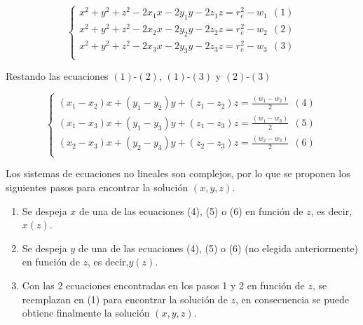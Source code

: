         \begin{equation*}
            \left\{ \begin{array}{c}
            	x^{2}+y^{2} +z^{2}-2x_{1}x-2y_{1}y-2z_{1}z = r_{e}^{2}- w_{1}~~  \left( 1 \right) \\
            	x^{2}+y^{2} +z^{2}-2x_{2}x-2y_{2}y-2z_{2}z = r_{e}^{2}- w_{2}~~  \left( 2 \right) \\
            	x^{2}+y^{2} +z^{2}-2x_{3}x-2y_{3}y-2z_{3}z = r_{e}^{2}- w_{3}~~  \left( 3 \right) \\
                \end{array} \right.   
        \end{equation*}
        
        Restando las ecuaciones $(1)$-$(2)$, $(1)$-$(3)$ y $(2)$-$(3)$
        
        \begin{equation*}
            \left\{ \begin{array}{c}
        	 \left( x_{1}-x_{2} \right) x+ \left( y_{1}-y_{2} \right) y+ \left( z_{1}-z_{2} \right) z= \frac{ \left( w_{1} - w_{2} \right) }{2}~~  \left( 4 \right) \\
        	 \left( x_{1}-x_{3} \right) x+ \left( y_{1}-y_{3} \right) y+ \left( z_{1}-z_{3} \right) z= \frac{ \left( w_{1} - w_{3} \right) }{2}~~  \left( 5 \right) \\
        	 \left( x_{2}-x_{3} \right) x+ \left( y_{2}-y_{3} \right) y+ \left( z_{2}-z_{3} \right) z= \frac{ \left( w_{2} - w_{3} \right) }{2}~~  \left( 6 \right) \\
                \end{array} \right.   
        \end{equation*}
        
        Los sistemas de ecuaciones no lineales son complejos, por lo que se proponen los siguientes pasos para encontrar la solución $(x, y, z)$.
        
        \begin{enumerate}
        	\item {Se despeja $x$ de una de las ecuaciones (4), (5) o (6) en función de $z$, es decir,$x(z)$.}
        	\item {Se despeja $y$ de una de las ecuaciones (4), (5) o (6) (no elegida anteriormente) en función de $z$, es decir,$y(z)$.}
        	\item {Con las 2 ecuaciones encontradas en los pasos 1 y 2 en función de $z$, se reemplazan en (1) para encontrar la solución de $z$, en consecuencia se puede obtiene finalmente la solución $(x, y, z)$.}
        \end{enumerate}
        

